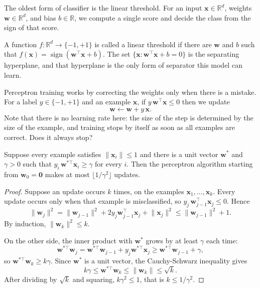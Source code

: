 The oldest form of classifier is the linear threshold. For an input
$\mathbf{x}\in\mathbb{R}^{d}$, weights $\mathbf{w}\in\mathbb{R}^{d}$, and bias
$b\in\mathbb{R}$, we compute a single score and decide the class from the sign of that score.


\begin{definisi}
A function $f:\mathbb{R}^{d}\to\{-1,+1\}$ is called a linear threshold if there are
$\mathbf{w}$ and $b$ such that $f(\mathbf{x})=\operatorname{sign}(\mathbf{w}^{\top}\mathbf{x}+b)$.
The set $\{\mathbf{x}:\mathbf{w}^{\top}\mathbf{x}+b=0\}$ is the separating hyperplane, and that
hyperplane is the only form of separator this model can learn.
\end{definisi}

Perceptron training works by correcting the weights only when there is a mistake. For a label
$y\in\{-1,+1\}$ and an example $\mathbf{x}$, if $y\,\mathbf{w}^{\top}\mathbf{x}\le 0$ then we
update
\[
  \mathbf{w}\leftarrow\mathbf{w}+y\,\mathbf{x}.
\]
Note that there is no learning rate here: the size of the step is determined by the size of the
example, and training stops by itself as soon as all examples are correct. Does it always stop?

\begin{teorema}
Suppose every example satisfies $\lVert\mathbf{x}_{i}\rVert\le1$ and there is a unit vector
$\mathbf{w}^{*}$ and $\gamma>0$ such that $y_{i}\,\mathbf{w}^{*\top}\mathbf{x}_{i}\ge\gamma$ for
every $i$. Then the perceptron algorithm starting from $\mathbf{w}_{0}=\mathbf{0}$ makes at most
$\lfloor1/\gamma^{2}\rfloor$ updates.
\end{teorema}

\begin{proof}
Suppose an update occurs $k$ times, on the examples $\mathbf{x}_{1},\dots,\mathbf{x}_{k}$. Every
update occurs only when that example is misclassified, so
$y_{j}\,\mathbf{w}_{j-1}^{\top}\mathbf{x}_{j}\le0$. Hence
\[
  \lVert\mathbf{w}_{j}\rVert^{2}
  =\lVert\mathbf{w}_{j-1}\rVert^{2}+2y_{j}\mathbf{w}_{j-1}^{\top}\mathbf{x}_{j}
   +\lVert\mathbf{x}_{j}\rVert^{2}
  \le\lVert\mathbf{w}_{j-1}\rVert^{2}+1 .
\]
By induction, $\lVert\mathbf{w}_{k}\rVert^{2}\le k$.

On the other side, the inner product with $\mathbf{w}^{*}$ grows by at least $\gamma$ each
time:
\[
  \mathbf{w}^{*\top}\mathbf{w}_{j}
  =\mathbf{w}^{*\top}\mathbf{w}_{j-1}+y_{j}\mathbf{w}^{*\top}\mathbf{x}_{j}
  \ge\mathbf{w}^{*\top}\mathbf{w}_{j-1}+\gamma ,
\]
so $\mathbf{w}^{*\top}\mathbf{w}_{k}\ge k\gamma$. Since $\mathbf{w}^{*}$ is a unit vector, the
Cauchy-Schwarz inequality gives
\[
  k\gamma\le\mathbf{w}^{*\top}\mathbf{w}_{k}\le\lVert\mathbf{w}_{k}\rVert\le\sqrt{k}.
\]
After dividing by $\sqrt{k}$ and squaring, $k\gamma^{2}\le1$, that is $k\le1/\gamma^{2}$.
\end{proof}

